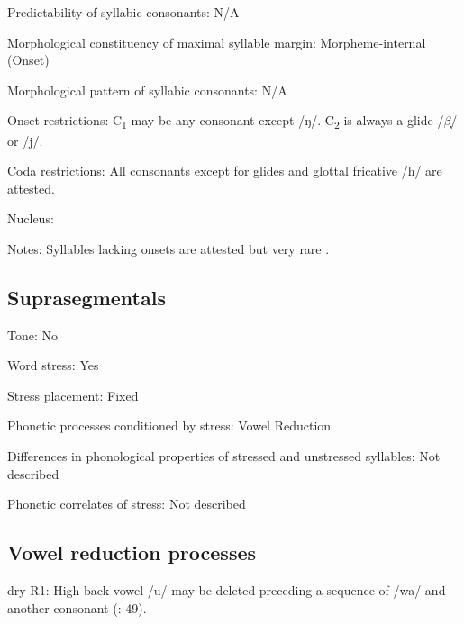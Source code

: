 {\begin{appendixdesc}
\item[Predictability of syllabic consonants:] N/A

\item[Morphological constituency of maximal syllable margin:] Morpheme-internal (Onset)

\item[Morphological pattern of syllabic consonants:] N/A

\item[Onset restrictions:] C\textsubscript{1} may be any consonant except /ŋ/. C\textsubscript{2} is always a glide /$\beta ̞$/ or /j/.

\item[Coda restrictions:] All consonants except for glides and glottal fricative /h/ are attested.

\item[Nucleus:]

\item[Notes:] Syllables lacking onsets are attested but very rare \citep[19]{Dhakal2012}.
\end{appendixdesc}
\subsection*{Suprasegmentals}
\begin{appendixdesc}
\item[Tone:] No

\item[Word stress:] Yes

\item[Stress placement:] Fixed

\item[Phonetic processes conditioned by stress:] Vowel Reduction

\item[Differences in phonological properties of stressed and unstressed syllables:] Not described

\item[Phonetic correlates of stress:] Not described
\end{appendixdesc}
\subsection*{Vowel reduction processes}
\begin{appendixdesc}

\item[dry-R1:] High back vowel /u/ may be deleted preceding a sequence of /wa/ and another consonant (\citealt{KotapishKotapish1973}: 49).
\end{appendixdesc}
}
